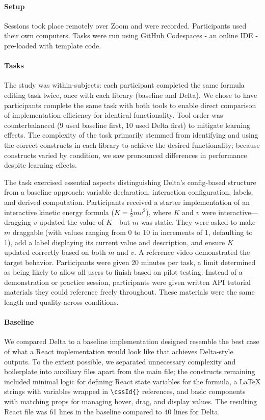 \paragraph{Setup} Sessions took place remotely over Zoom and were recorded. Participants used their own computers. Tasks were run using GitHub Codespaces - an online IDE - pre-loaded with template code.

\paragraph{Tasks} The study was within-subjects: each participant completed the same formula editing task twice, once with each library (baseline and Delta). We chose to have participants complete the same task with both tools to enable direct comparison of implementation efficiency for identical functionality. Tool order was counterbalanced (9 used baseline first, 10 used Delta first) to mitigate learning effects. The complexity of the task primarily stemmed from identifying and using the correct constructs in each library to achieve the desired functionality; because constructs varied by condition, we saw pronounced differences in performance despite learning effects.

The task exercised essential aspects distinguishing Delta's config-based structure from a baseline approach: variable declaration, interaction configuration, labels, and derived computation. Participants received a starter implementation of an interactive kinetic energy formula ($K = \frac{1}{2}mv^2$), where $K$ and $v$ were interactive---dragging $v$ updated the value of $K$---but $m$ was static. They were asked to make $m$ draggable (with values ranging from 0 to 10 in increments of 1, defaulting to 1), add a label displaying its current value and description, and ensure $K$ updated correctly based on both $m$ and $v$. A reference video demonstrated the target behavior. Participants were given 20 minutes per task, a limit determined as being likely to allow all users to finish based on pilot testing. Instead of a demonstration or practice session, participants were given written API tutorial materials they could reference freely throughout. These materials were the same length and quality across conditions.

\paragraph{Baseline} We compared Delta to a baseline implementation designed resemble the best case of what a React implementation would look like that achieves Delta-style outputs. To the extent possible, we separated unnecessary complexity and boilerplate into auxiliary files apart from the main file; the constructs remaining included 
minimal logic for defining React state variables for the formula, a LaTeX strings with variables wrapped in \texttt{\textbackslash cssId\{\}} references, and basic components with matching props for managing hover, drag, and display values. The resulting React file was 61 lines in the baseline compared to 40 lines for Delta.

